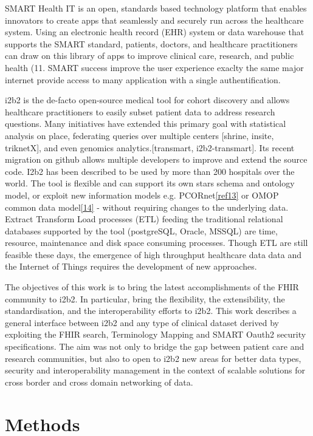 \documentclass{amia}
\begin{document}
SMART Health IT is an open, standards based technology platform that enables innovators to create apps that seamlessly and securely run across the healthcare system. Using an electronic health record (EHR) system or data warehouse that supports the SMART standard, patients, doctors, and healthcare practitioners can draw on this library of apps to improve clinical care, research, and public health (11. SMART success improve the user experience exaclty the same major internet provide access to many application with a single authentification.

i2b2 is the de-facto open-source medical tool for cohort discovery and allows healthcare practitioners to easily subset patient data to address research questions. Many initiatives have extended this primary goal with statistical analysis on place, federating queries over multiple centers [shrine, insite, triknetX], and even genomics analytics.[transmart, i2b2-transmart]. Its recent migration on github allows multiple developers to improve and extend the source code. I2b2 has been described to be used by more than 200 hospitals over the world. The tool is flexible and can support its own stars schema and ontology model, or exploit new information models e.g. PCORnet\ref{ref13} or OMOP common data model\ref{14} - without requiring changes to the underlying data. Extract Transform Load processes (ETL)  feeding the traditional relational databases supported by the tool (postgreSQL, Oracle, MSSQL) are time, resource, maintenance and disk space consuming processes. Though ETL are still feasible these days, the emergence of high throughput healthcare data data and the Internet of Things requires the development of new approaches.

The objectives of this work is to bring the latest accomplishments of the FHIR community to i2b2. In particular, bring the flexibility, the extensibility, the standardisation, and the interoperability efforts to i2b2.
This work describes a general interface between i2b2 and any type of clinical dataset derived by exploiting the FHIR search\cite{}, Terminology Mapping\cite{} and SMART Oauth2 security\cite{} specifications. The aim was not only to bridge the gap between patient care and research communities, but also to open to i2b2 new areas for better data types, security and interoperability management in the context of scalable solutions for cross border and cross domain networking of data.

\section*{Methods}
\end{document}
